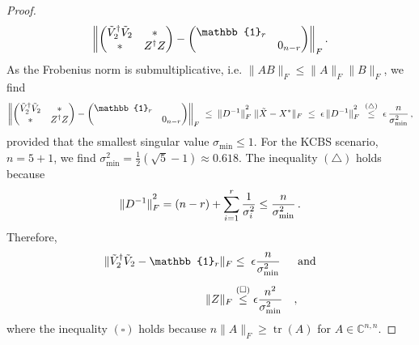 \begin{proof}
\begin{equation*}
\left\|
\begin{pmatrix}
\Tilde{V}_2^{\dag}\Tilde{V}_2 & * \\
* & Z^{\dag}Z
\end{pmatrix}
-
\begin{pmatrix}
\mathbb{1}_r & \\
& 0_{n-r}
\end{pmatrix}
\right\|_F.
\end{equation*}
As the Frobenius norm is submultiplicative, i.e. $\|AB\|_F\leq\|A\|_F\|B\|_F$, we find
\begin{equation*}
\left\|
\begin{pmatrix}
\Tilde{V}_2^{\dag}\Tilde{V}_2 & * \\
* & Z^{\dag}Z
\end{pmatrix}
-
\begin{pmatrix}
\mathbb{1}_r & \\
& 0_{n-r}
\end{pmatrix}
\right\|_F\;\leq\;\|D^{-1}\|^{\textstyle ^2}_F\;\|\Tilde{X}-X^{*}\|_F\; \leq\; \epsilon\thinspace\|D^{-1}\|_F^{\textstyle ^2}\;\stackrel{(\bigtriangleup)}{\leq}\;\epsilon\thinspace \frac{n}{\sigma_{\text{min}}^2}\thinspace,
\end{equation*}
provided that the smallest singular value $\sigma_{\text{min}}\leq 1$. For the KCBS scenario, $n=5+1$, we find $\sigma^2_{\text{min}}=\frac{1}{2}(\sqrt{5}-1)\approx 0.618$. The inequality $(\bigtriangleup)$ holds because
\begin{equation*}
\|D^{-1}\|_F^{\textstyle ^2} = (n-r)+\sum_{i=1}^r\frac{1}{\sigma_i^2}\leq\frac{n}{\sigma_{\text{min}}^2}\thinspace. 
\end{equation*}
Therefore,
\begin{alignat*}{2}
\|\Tilde{V}_2^{\dag}\Tilde{V}_2-\mathbb{1}_r\|_F & \leq\;\epsilon\frac{n}{\sigma_{\text{min}}^2} && \text{ and}\\[0.5em]
\|Z\|_F & \stackrel{(\square)}{\leq} \epsilon\frac{n^2}{\sigma_{\text{min}}^2}&&,
\end{alignat*}
where the inequality $(\square)$ holds because $n\|A\|_F\geq\operatorname{tr}(A)$ for $A\in\mathbb{C}^{n,n}$. 



\end{proof}
